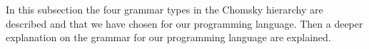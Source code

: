 In this subsection the four grammar types in the Chomsky hierarchy are described and that we have chosen for our programming language. Then a deeper explanation on the grammar for our programming language are explained.
